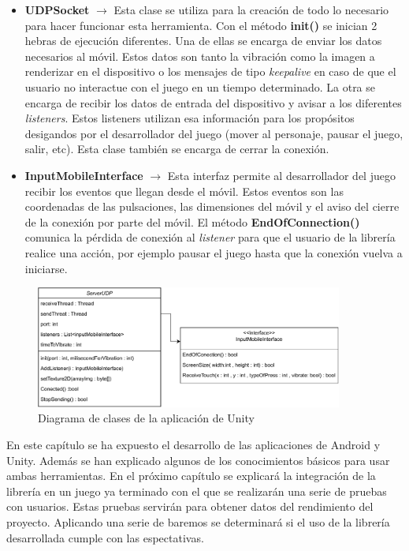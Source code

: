 \begin {itemize}
\item \textbf{UDPSocket} $\rightarrow$ Esta clase se utiliza para la creaci\'on de todo lo necesario para hacer funcionar esta herramienta. Con el m\'etodo \textbf{init()} se inician 2 hebras de ejecuci\'on diferentes. Una de ellas se encarga de enviar los datos necesarios al m\'ovil. Estos datos son tanto la vibraci\'on como la imagen a renderizar en el dispositivo o los mensajes de tipo \textit{keepalive} en caso de que el usuario no interactue con el juego en un tiempo determinado. La otra se encarga de recibir los datos de entrada del dispositivo y avisar a los diferentes \textit{listeners}. Estos listeners utilizan esa informaci\'on para los prop\'ositos desigandos por el desarrollador del juego (mover al personaje, pausar el juego, salir, etc). Esta clase tambi\'en se encarga de cerrar la conexi\'on.

\item \textbf{InputMobileInterface} $\rightarrow$ Esta interfaz permite al desarrollador del juego recibir los eventos que llegan desde el m\'ovil. Estos eventos son las coordenadas de las pulsaciones, las dimensiones del m\'ovil y el aviso del cierre de la conexi\'on por parte del m\'ovil. El m\'etodo \textbf{EndOfConnection()} comunica la p\'erdida de conexi\'on al \textit{listener} para que el usuario de la librer\'ia realice una acci\'on, por ejemplo pausar el juego hasta que la conexi\'on vuelva a iniciarse.
\end {itemize}

\begin{figure}[h]

\centering
\includegraphics[width=0.9\textwidth]{./Imagenes/Vectorial/Arquitectura Unity.pdf}
\caption{Diagrama de clases de la aplicaci\'on de Unity}
\end{figure}

En este cap\'itulo se ha expuesto el desarrollo de las aplicaciones de Android y Unity. Adem\'as se han explicado algunos de los conocimientos b\'asicos para usar ambas herramientas. En el pr\'oximo cap\'itulo se explicar\'a la integraci\'on de la librer\'ia en un juego ya terminado con el que se realizar\'an una serie de pruebas con usuarios. Estas pruebas servir\'an para obtener datos del rendimiento del proyecto. Aplicando una serie de baremos se determinar\'a si el uso de la librer\'ia desarrollada cumple con las espectativas.\\

